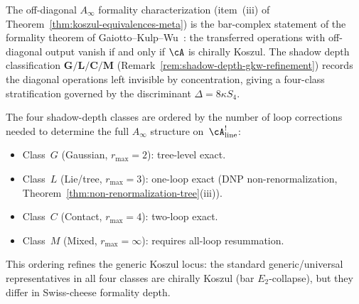 \begin{remark}
\label{rem:ainfty-formality-gkw}
The off-diagonal $A_\infty$ formality characterization
(item~(iii) of Theorem~\ref{thm:koszul-equivalences-meta})
is the bar-complex statement of the formality theorem of
Gaiotto--Kulp--Wu~\cite{GKW2025}: the transferred operations with
off-diagonal output vanish if and only if $\cA$ is chirally Koszul.
The shadow depth classification
$\mathbf{G}/\mathbf{L}/\mathbf{C}/\mathbf{M}$
(Remark~\ref{rem:shadow-depth-gkw-refinement}) records the diagonal
operations left invisible by concentration, giving a four-class
stratification governed by the discriminant $\Delta = 8\kappa S_4$.
\end{remark}

\begin{remark}
\label{rem:loop-exactness-ordering}
The four shadow-depth classes are ordered by the number of loop corrections needed to determine the full $A_\infty$ structure on~$\cA^!_{\mathrm{line}}$:
\begin{itemize}
\item Class~$G$ (Gaussian, $r_{\max}=2$): tree-level exact.
\item Class~$L$ (Lie/tree, $r_{\max}=3$): one-loop exact (DNP non-renormalization, Theorem~\ref{thm:non-renormalization-tree}(iii)).
\item Class~$C$ (Contact, $r_{\max}=4$): two-loop exact.
\item Class~$M$ (Mixed, $r_{\max}=\infty$): requires all-loop resummation.
\end{itemize}
This ordering refines the generic Koszul locus: the standard
generic/universal representatives in all four classes are chirally
Koszul (bar $E_2$-collapse), but they differ in Swiss-cheese formality
depth.
\end{remark}

